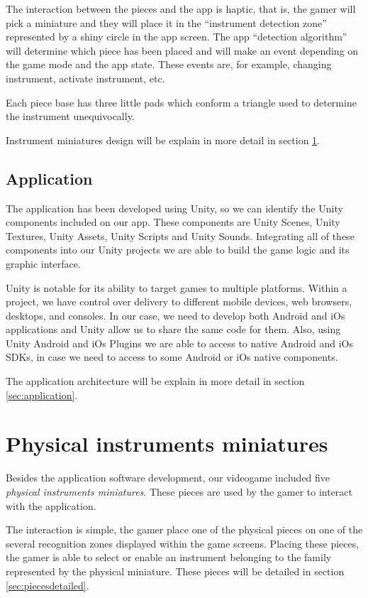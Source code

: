 The interaction between the pieces and the app is haptic, that is, the gamer will pick a miniature and they will place it in the “instrument detection zone” represented by a shiny circle in the app screen. The app “detection algorithm” will determine which piece has been placed and will make an event depending on the game mode and the app state. These events are, for example, changing instrument, activate instrument, etc.

Each piece base has three little pads which conform a triangle used to determine the instrument unequivocally.

Instrument miniatures design will be explain in more detail in section \ref{sec:instrumentminuatures}.

\subsection{Application}
The application has been developed using Unity, so we can identify the Unity components included on our app. These components are Unity Scenes, Unity Textures, Unity Assets, Unity Scripts and Unity Sounds. Integrating all of these components into our Unity projects we are able to build the game logic and its graphic interface.

Unity is notable for its ability to target games to multiple platforms. Within a project, we have control over delivery to different mobile devices, web browsers, desktops, and consoles. In our case, we need to develop both Android and iOs applications and Unity allow us to share the same code for them. Also, using Unity Android and iOs Plugins we are able to access to native Android and iOs SDKs, in case we need to access to some Android or iOs native components.

The application architecture will be explain in more detail in section \ref{sec:application}.

\FloatBarrier

\section{Physical instruments miniatures}
\label{sec:instrumentminuatures}
Besides the application software development, our videogame included five \textit{physical instruments miniatures}. These pieces are used by the gamer to interact with the application.

The interaction is simple, the gamer place one of the physical pieces on one of the several recognition zones displayed within the game screens. Placing these pieces, the gamer is able to select or enable an instrument belonging to the family represented by the physical miniature. These pieces will be detailed in section \ref{sec:piecesdetailed}.


